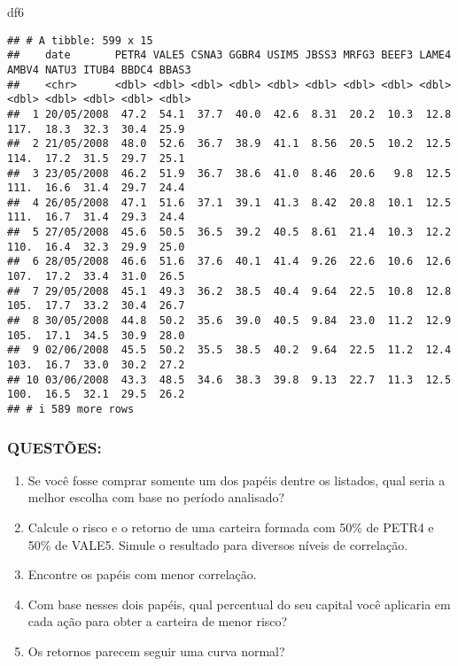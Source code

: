 \documentclass[
]{article}
\newenvironment{Shaded}{\begin{snugshade}}{\end{snugshade}}
\newcommand{\NormalTok}[1]{#1}
\providecommand{\tightlist}{%
  \setlength{\itemsep}{0pt}\setlength{\parskip}{0pt}}
\begin{document}
\begin{Shaded}
\begin{Highlighting}[]
\NormalTok{df6}
\end{Highlighting}
\end{Shaded}

\begin{verbatim}
## # A tibble: 599 x 15
##    date       PETR4 VALE5 CSNA3 GGBR4 USIM5 JBSS3 MRFG3 BEEF3 LAME4 AMBV4 NATU3 ITUB4 BBDC4 BBAS3
##    <chr>      <dbl> <dbl> <dbl> <dbl> <dbl> <dbl> <dbl> <dbl> <dbl> <dbl> <dbl> <dbl> <dbl> <dbl>
##  1 20/05/2008  47.2  54.1  37.7  40.0  42.6  8.31  20.2  10.3  12.8  117.  18.3  32.3  30.4  25.9
##  2 21/05/2008  48.0  52.6  36.7  38.9  41.1  8.56  20.5  10.2  12.5  114.  17.2  31.5  29.7  25.1
##  3 23/05/2008  46.2  51.9  36.7  38.6  41.0  8.46  20.6   9.8  12.5  111.  16.6  31.4  29.7  24.4
##  4 26/05/2008  47.1  51.6  37.1  39.1  41.3  8.42  20.8  10.1  12.5  111.  16.7  31.4  29.3  24.4
##  5 27/05/2008  45.6  50.5  36.5  39.2  40.5  8.61  21.4  10.3  12.2  110.  16.4  32.3  29.9  25.0
##  6 28/05/2008  46.6  51.6  37.6  40.1  41.4  9.26  22.6  10.6  12.6  107.  17.2  33.4  31.0  26.5
##  7 29/05/2008  45.1  49.3  36.2  38.5  40.4  9.64  22.5  10.8  12.8  105.  17.7  33.2  30.4  26.7
##  8 30/05/2008  44.8  50.2  35.6  39.0  40.5  9.84  23.0  11.2  12.9  105.  17.1  34.5  30.9  28.0
##  9 02/06/2008  45.5  50.2  35.5  38.5  40.2  9.64  22.5  11.2  12.4  103.  16.7  33.0  30.2  27.2
## 10 03/06/2008  43.3  48.5  34.6  38.3  39.8  9.13  22.7  11.3  12.5  100.  16.5  32.1  29.5  26.2
## # i 589 more rows
\end{verbatim}

\hypertarget{questuxf5es-5}{%
\subsubsection{QUESTÕES:}\label{questuxf5es-5}}

\begin{enumerate}
\def\labelenumi{\alph{enumi})}
\tightlist
\item
  Se você fosse comprar somente um dos papéis dentre os listados, qual
  seria a melhor escolha com base no período analisado?\\
\item
  Calcule o risco e o retorno de uma carteira formada com 50\% de PETR4
  e 50\% de VALE5. Simule o resultado para diversos níveis de
  correlação.\\
\item
  Encontre os papéis com menor correlação.\\
\item
  Com base nesses dois papéis, qual percentual do seu capital você
  aplicaria em cada ação para obter a carteira de menor risco?\\
\item
  Os retornos parecem seguir uma curva normal?
\end{enumerate}
\end{document}
